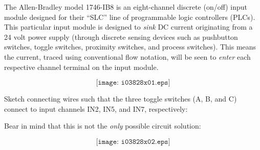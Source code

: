 

The Allen-Bradley model 1746-IB8 is an eight-channel discrete (on/off) input module designed for their ``SLC'' line of programmable logic controllers (PLCs).  This particular input module is designed to {\it sink} DC current originating from a 24 volt power supply (through discrete sensing devices such as pushbutton switches, toggle switches, proximity switches, and process switches).  This means the current, traced using conventional flow notation, will be seen to {\it enter} each respective channel terminal on the input module.

$$\texttt{[image: i03828x01.eps]}$$

Sketch connecting wires such that the three toggle switches (A, B, and C) connect to input channels IN2, IN5, and IN7, respectively:














Bear in mind that this is not the {\it only} possible circuit solution:

$$\texttt{[image: i03828x02.eps]}$$




